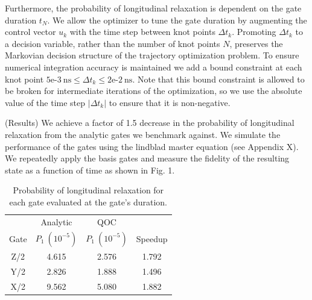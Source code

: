\documentclass[
  amsfonts,
  amsmath,
  tbtags,
  amssymb,
  aps,
  nobibnotes,
  prl,
  twocolumn,
]{revtex4-2}
\begin{document}
Furthermore, the probability of longitudinal 
relaxation is dependent on the gate duration $t_{N}$.
We allow the optimizer to tune the gate duration by
augmenting the control vector $u_{k}$ with
the time step between knot points $\Delta t_{k}$.
Promoting $\Delta t_{k}$ to a decision variable, rather
than the number of knot points $N$, preserves the
Markovian decision structure of the trajectory
optimization problem. To ensure numerical
integration accuracy is maintained we add a bound
constraint at each knot point
$5\textrm{e-}3 \ \textrm{ns} \le
\Delta t_{k} \le 2\textrm{e-}2 \ \textrm{ns}$.
Note that this bound constraint is allowed to be
broken for intermediate iterations of the optimization,
so we use the absolute value of the time step
$\lvert \Delta t_{k} \rvert$ to ensure that it is non-negative.

(Results) We achieve a factor of 1.5 decrease in the probability
of longitudinal relaxation from the analytic gates we benchmark
against. We simulate the performance of the gates using the
lindblad master equation (see Appendix X). We repeatedly apply the basis gates
and measure the fidelity of the resulting state as a function
of time as shown in Fig. 1.

\begin{table}
  \begin{tabular}{c | c | c | c}
    & Analytic  & QOC &\\
    Gate & $P_{1}\ (10^{-5})$ & $P_{1}\ (10^{-5})$ & Speedup\\
    \hline
    Z/2 & 4.615 & 2.576 & 1.792\\
    Y/2 & 2.826 & 1.888 & 1.496\\
    X/2 & 9.562 & 5.080 & 1.882\\
  \end{tabular}
  \caption{Probability of longitudinal relaxation for each gate
    evaluated at the gate's duration.}
\end{table}
\end{document}
